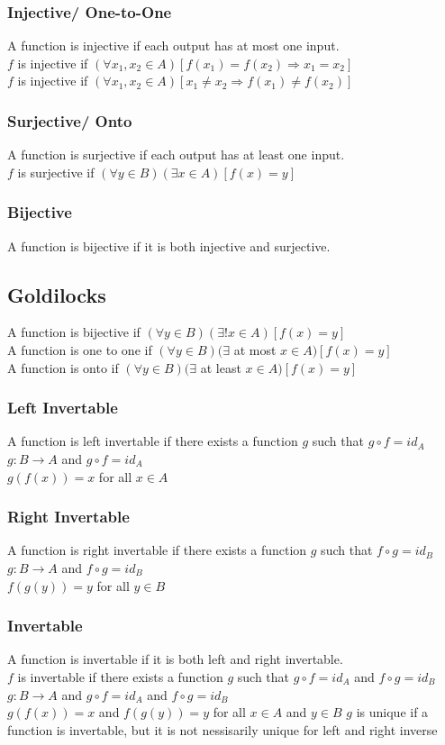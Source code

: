 \documentclass{article}
\begin{document}
\subsubsection*{Injective/ One-to-One}
A function is injective if each output has at most one input.\\
$f$ is injective if $(\forall x_1,x_2 \in A)[f(x_1) = f(x_2) \Rightarrow x_1 = x_2]$\\
$f$ is injective if $(\forall x_1,x_2 \in A)[x_1 \neq x_2 \Rightarrow f(x_1) \neq f(x_2)]$
\subsubsection*{Surjective/ Onto}
A function is surjective if each output has at least one input.\\
$f$ is surjective if $(\forall y \in B)(\exists x \in A)[f(x) = y]$
\subsubsection*{Bijective}
A function is bijective if it is both injective and surjective.
\subsection*{Goldilocks}
A function is bijective if $(\forall y \in B)(\exists! x \in A)[f(x) = y]$\\
A function is one to one if $(\forall y \in B)(\exists$ at most $x \in A)[f(x) = y]$\\
A function is onto if $(\forall y \in B)(\exists$ at least $x \in A)[f(x) = y]$
\subsubsection*{Left Invertable}
A function is left invertable if there exists a function $g$ such that $g \circ f = id_A$\\
$g : B \rightarrow A$ and $g \circ f = id_A$\\
$g(f(x)) = x$ for all $x \in A$
\subsubsection*{Right Invertable}
A function is right invertable if there exists a function $g$ such that $f \circ g = id_B$\\
$g : B \rightarrow A$ and $f \circ g = id_B$\\
$f(g(y)) = y$ for all $y \in B$
\subsubsection*{Invertable}
A function is invertable if it is both left and right invertable.\\
$f$ is invertable if there exists a function $g$ such that $g \circ f = id_A$ and $f \circ g = id_B$\\
$g : B \rightarrow A$ and $g \circ f = id_A$ and $f \circ g = id_B$\\
$g(f(x)) = x$ and $f(g(y)) = y$ for all $x \in A$ and $y \in B$
$g$ is unique if a function is invertable, but it is not nessisarily unique for left and right inverse
\end{document}
